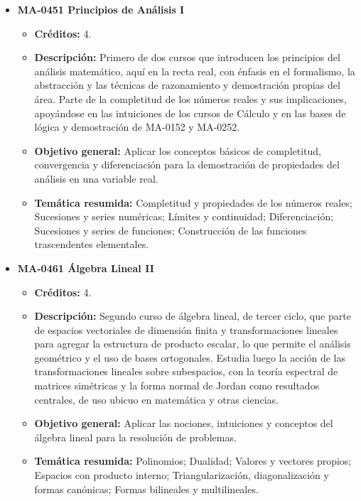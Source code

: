 \begin{itemize}[leftmargin=1.3em, itemsep=10pt, topsep=4pt, label={\color{Azul-UCR}$\blacksquare$}]
\item {\color{Azul-UCR}\textbf{MA-0451 Principios de Análisis I}}\par\nopagebreak\smallskip
\begin{itemize}[leftmargin=1.1em, itemsep=3pt, topsep=2pt, parsep=2pt, label={\textendash}]
\item \textbf{Créditos:} 4.
\item \textbf{Descripción:} Primero de dos cursos que introducen los principios del análisis matemático, aquí en la recta real, con énfasis en el formalismo, la abstracción y las técnicas de razonamiento y demostración propias del área. Parte de la completitud de los números reales y sus implicaciones, apoyándose en las intuiciones de los cursos de Cálculo y en las bases de lógica y demostración de MA-0152 y MA-0252.
\item \textbf{Objetivo general:} Aplicar los conceptos básicos de completitud, convergencia y diferenciación para la demostración de propiedades del análisis en una variable real.
\item \textbf{Temática resumida:} Completitud y propiedades de los números reales; Sucesiones y series numéricas; Límites y continuidad; Diferenciación; Sucesiones y series de funciones; Construcción de las funciones trascendentes elementales.
\end{itemize}

\item {\color{Azul-UCR}\textbf{MA-0461 Álgebra Lineal II}}\par\nopagebreak\smallskip
\begin{itemize}[leftmargin=1.1em, itemsep=3pt, topsep=2pt, parsep=2pt, label={\textendash}]
\item \textbf{Créditos:} 4.
\item \textbf{Descripción:} Segundo curso de álgebra lineal, de tercer ciclo, que parte de espacios vectoriales de dimensión finita y transformaciones lineales para agregar la estructura de producto escalar, lo que permite el análisis geométrico y el uso de bases ortogonales. Estudia luego la acción de las transformaciones lineales sobre subespacios, con la teoría espectral de matrices simétricas y la forma normal de Jordan como resultados centrales, de uso ubicuo en matemática y otras ciencias.
\item \textbf{Objetivo general:} Aplicar las nociones, intuiciones y conceptos del álgebra lineal para la resolución de problemas.
\item \textbf{Temática resumida:} Polinomios; Dualidad; Valores y vectores propios; Espacios con producto interno; Triangularización, diagonalización y formas canónicas; Formas bilineales y multilineales.
\end{itemize}


\end{itemize}
